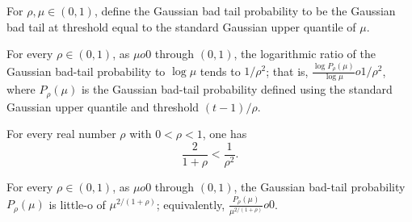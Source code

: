 \begin{definition}
\label{FABL.gaussianBadTailProbability}
\leanok
{}
For $\rho,\mu\in(0,1)$, define the Gaussian bad tail probability to be the Gaussian bad
tail at threshold equal to the standard Gaussian upper quantile of $\mu$.
\end{definition}

\begin{theorem}
\label{FABL.gaussianBadTailProbability_hasSoftPower}
\leanok
{}
For every $\rho\in(0,1)$, as $\mu	o0$ through $(0,1)$, the logarithmic ratio of the
Gaussian bad-tail probability to $\log\mu$ tends to $1/\rho^2$; that is, $\frac{\log
P_\rho(\mu)}{\log\mu}	o1/\rho^2$, where $P_\rho(\mu)$ is the Gaussian bad-tail probability
defined using the standard Gaussian upper quantile and threshold $(t-1)/\rho$.
\end{theorem}

\begin{theorem}
\label{FABL.mainPower_lt_badTailPower}
\leanok
{}
For every real number $\rho$ with $0<\rho<1$, one has
\[\frac{2}{1+\rho}<\frac{1}{\rho^2}.\]
\end{theorem}

\begin{theorem}
\label{FABL.gaussianBadTailProbability_isLittleO_mainPower}
\leanok
{}
For every $\rho\in(0,1)$, as $\mu	o0$ through $(0,1)$, the Gaussian bad-tail probability
$P_\rho(\mu)$ is little-o of $\mu^{2/(1+\rho)}$; equivalently,
$\frac{P_\rho(\mu)}{\mu^{2/(1+\rho)}}	o0$.
\end{theorem}
